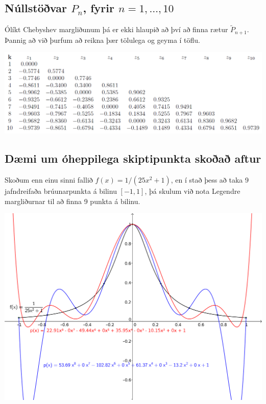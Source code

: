 \documentclass[A4paper,10pt,icelandic]{sphinxmanual}
\begin{document}
\subsection{Núllstöðvar \(P_n\), fyrir \(n=1,\ldots,10\)}
\label{kafli03:nullstovar-fyrir}
Ólíkt Chebyshev margliðunum þá er ekki hlaupið að því að finna rætur
\(\tilde P_{n+1}\). Þannig að við þurfum að reikna þær tölulega og
geyma í töflu.

\includegraphics{legendre.png}


\subsection{Dæmi um óheppilega skiptipunkta skoðað aftur}
\label{kafli03:id7}
Skoðum enn einu sinni fallið \(f(x) = 1/(25x^2+1)\), en í stað þess
að taka 9 jafndreifaða brúunarpunkta á bilinu \([-1,1]\), þá skulum
við nota Legendre margliðurnar til að finna 9 punkta á bilinu.

\includegraphics{vond_bruun3.png}
\end{document}
